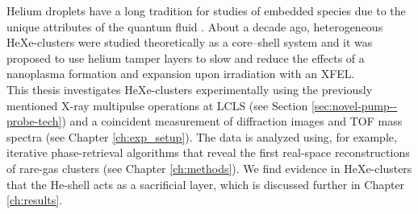 %
Helium droplets have a long tradition for studies of embedded species due to the unique attributes of the quantum fluid \citep{VonHaeften-1997-PRL,VonPietrowski-2006-EPJ,Stienkemeier-2006-JPhysB,Buchta-2013-JCPA,Gomez-2014-Science}. About a decade ago, heterogeneous HeXe-clusters were studied theoretically as a core--shell system \citep{Mikaberidze-2008-PRA} and it was proposed to use helium tamper layers to slow and reduce the effects of a nanoplasma formation and expansion upon irradiation with an XFEL.\\[1\baselineskip]
%
This thesis investigates HeXe-clusters experimentally using the previously mentioned X-ray multipulse operations at LCLS (see Section \ref{sec:novel-pump--probe-tech}) and a coincident measurement of diffraction images and TOF mass spectra (see Chapter \ref{ch:exp_setup}). The data is analyzed using, for example, iterative phase-retrieval algorithms that reveal the first real-space reconstructions of rare-gas clusters (see Chapter \ref{ch:methods}). We find evidence in HeXe-clusters that the He-shell acts as a sacrificial layer, which is discussed further in Chapter \ref{ch:results}.
